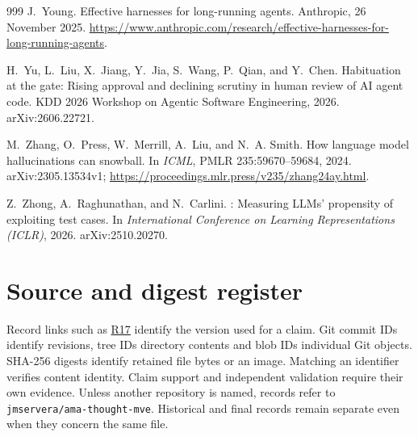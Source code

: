 \documentclass[11pt,a4paper]{article}
\newcommand{\sourceref}[1]{\hyperref[prov:#1]{\textsf{#1}}}
\begin{document}
\begin{thebibliography}{999}
J.~Young.
\newblock Effective harnesses for long-running agents.
\newblock Anthropic, 26 November 2025.
\newblock \url{https://www.anthropic.com/research/effective-harnesses-for-long-running-agents}.

H.~Yu, L.~Liu, X.~Jiang, Y.~Jia, S.~Wang, P.~Qian, and Y.~Chen.
\newblock Habituation at the gate: Rising approval and declining scrutiny in
human review of {AI} agent code.
\newblock KDD 2026 Workshop on Agentic Software Engineering, 2026.
\newblock arXiv:2606.22721.

M.~Zhang, O.~Press, W.~Merrill, A.~Liu, and N.~A. Smith.
\newblock How language model hallucinations can snowball.
\newblock In \emph{ICML}, PMLR 235:59670--59684, 2024.
\newblock arXiv:2305.13534v1;
\url{https://proceedings.mlr.press/v235/zhang24ay.html}.

Z.~Zhong, A.~Raghunathan, and N.~Carlini.
: Measuring {LLMs}' propensity of exploiting test
cases.
\newblock In \emph{International Conference on Learning Representations
(ICLR)}, 2026.
\newblock arXiv:2510.20270.

\end{thebibliography}
\endgroup

\appendix


\FloatBarrier
\section{Source and digest register}\label{app:source-register}

Record links such as \sourceref{R17} identify the version used for a claim.
Git commit IDs identify revisions, tree IDs directory contents and blob IDs
individual Git objects. SHA-256 digests identify retained file bytes or an
image. Matching an identifier verifies content identity. Claim support and
independent validation require their own evidence. Unless another repository is named, records refer to
\nolinkurl{jmservera/ama-thought-mve}. Historical and final records remain
separate even when they concern the same file.
\end{document}
